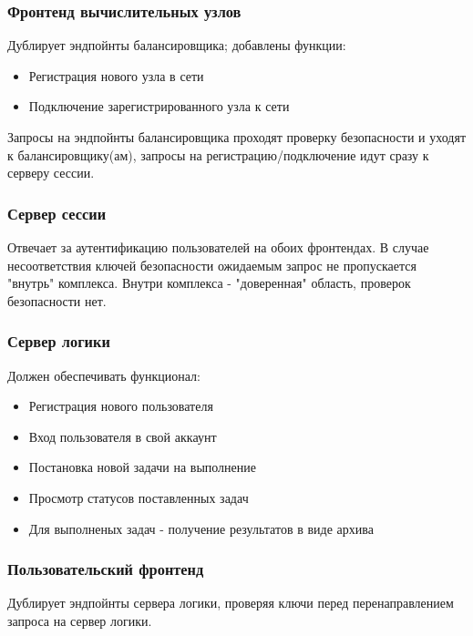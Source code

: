 \documentclass[a4paper,12pt]{report}
\numberwithin{equation}{section}
\begin{document}
\subsubsection{Фронтенд вычислительных узлов}
Дублирует эндпойнты балансировщика; добавлены функции:
\begin{itemize}
  \item Регистрация нового узла в сети
  \item Подключение зарегистрированного узла к сети
\end{itemize}
Запросы на эндпойнты балансировщика проходят проверку безопасности и уходят к балансировщику(ам), запросы на регистрацию/подключение идут сразу к серверу сессии.

\subsubsection{Сервер сессии}
Отвечает за аутентификацию пользователей на обоих фронтендах. 
В случае несоответствия ключей безопасности ожидаемым запрос не пропускается "внутрь" комплекса.
Внутри комплекса - "доверенная" область, проверок безопасности нет.

\subsubsection{Сервер логики}
Должен обеспечивать функционал:
\begin{itemize}
  \item Регистрация нового пользователя
  \item Вход пользователя в свой аккаунт
  \item Постановка новой задачи на выполнение
  \item Просмотр статусов поставленных задач
  \item Для выполненых задач - получение результатов в виде архива
\end{itemize}

\subsubsection{Пользовательский фронтенд}
Дублирует эндпойнты сервера логики, проверяя ключи перед перенаправлением запроса на сервер логики.
\end{document}
